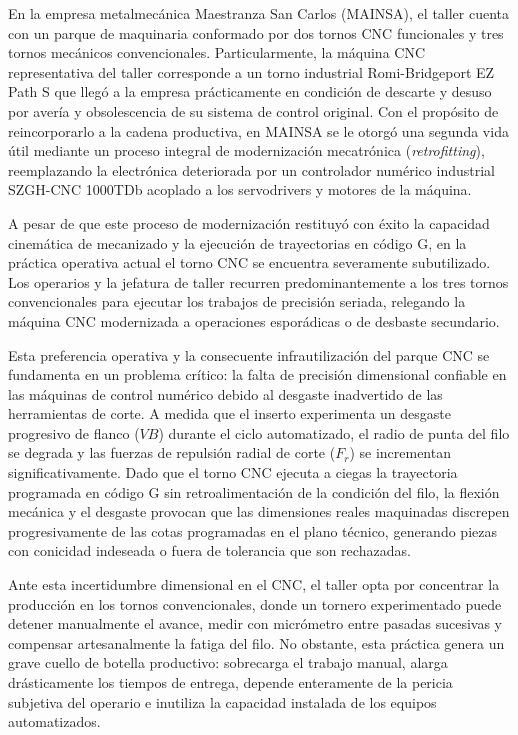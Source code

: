 En la empresa metalmecánica Maestranza San Carlos (MAINSA), el taller cuenta con un parque de maquinaria conformado por dos tornos CNC funcionales y tres tornos mecánicos convencionales. Particularmente, la máquina CNC representativa del taller corresponde a un torno industrial Romi-Bridgeport EZ Path S que llegó a la empresa prácticamente en condición de descarte y desuso por avería y obsolescencia de su sistema de control original. Con el propósito de reincorporarlo a la cadena productiva, en MAINSA se le otorgó una segunda vida útil mediante un proceso integral de modernización mecatrónica (\textit{retrofitting}), reemplazando la electrónica deteriorada por un controlador numérico industrial SZGH-CNC 1000TDb acoplado a los servodrivers y motores de la máquina.

A pesar de que este proceso de modernización restituyó con éxito la capacidad cinemática de mecanizado y la ejecución de trayectorias en código G, en la práctica operativa actual el torno CNC se encuentra severamente subutilizado. Los operarios y la jefatura de taller recurren predominantemente a los tres tornos convencionales para ejecutar los trabajos de precisión seriada, relegando la máquina CNC modernizada a operaciones esporádicas o de desbaste secundario.

Esta preferencia operativa y la consecuente infrautilización del parque CNC se fundamenta en un problema crítico: la falta de precisión dimensional confiable en las máquinas de control numérico debido al desgaste inadvertido de las herramientas de corte. A medida que el inserto experimenta un desgaste progresivo de flanco ($VB$) durante el ciclo automatizado, el radio de punta del filo se degrada y las fuerzas de repulsión radial de corte ($F_r$) se incrementan significativamente. Dado que el torno CNC ejecuta a ciegas la trayectoria programada en código G sin retroalimentación de la condición del filo, la flexión mecánica y el desgaste provocan que las dimensiones reales maquinadas discrepen progresivamente de las cotas programadas en el plano técnico, generando piezas con conicidad indeseada o fuera de tolerancia que son rechazadas.

Ante esta incertidumbre dimensional en el CNC, el taller opta por concentrar la producción en los tornos convencionales, donde un tornero experimentado puede detener manualmente el avance, medir con micrómetro entre pasadas sucesivas y compensar artesanalmente la fatiga del filo. No obstante, esta práctica genera un grave cuello de botella productivo: sobrecarga el trabajo manual, alarga drásticamente los tiempos de entrega, depende enteramente de la pericia subjetiva del operario e inutiliza la capacidad instalada de los equipos automatizados. 


